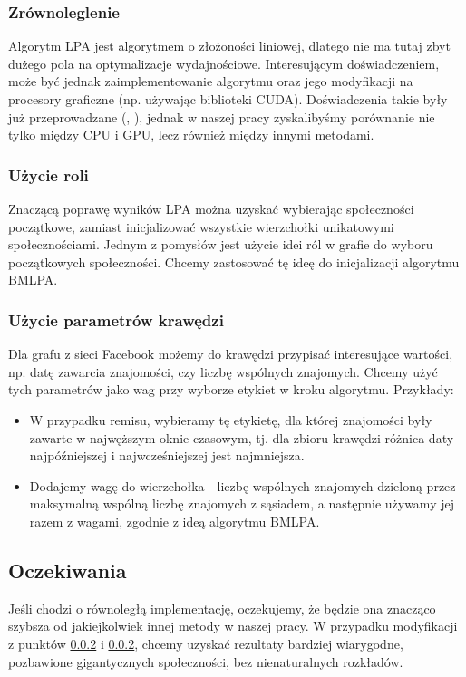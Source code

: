 \documentclass{article}
\begin{document}
\subsubsection{Zrównoleglenie}
Algorytm LPA jest algorytmem o złożoności liniowej, dlatego nie ma tutaj zbyt dużego pola na optymalizacje wydajnościowe. Interesującym doświadczeniem, może być jednak zaimplementowanie algorytmu oraz jego modyfikacji na procesory graficzne (np. używając biblioteki CUDA). Doświadczenia takie były już przeprowadzane (\cite{ms-paper5}, \cite{ms-paper6}), jednak w naszej pracy zyskalibyśmy porównanie nie tylko między CPU i GPU, lecz również między innymi metodami.
\subsubsection{Użycie roli}
\label{subsubsection:lparole}
Znaczącą poprawę wyników LPA można uzyskać wybierając społeczności początkowe, zamiast inicjalizować wszystkie wierzchołki unikatowymi społecznościami. Jednym z pomysłów jest użycie idei ról w grafie do wyboru początkowych społeczności\cite{ms-paper7}. Chcemy zastosować tę ideę do inicjalizacji algorytmu BMLPA.
\subsubsection{Użycie parametrów krawędzi}
\label{subsubsection:lpaedges}
Dla grafu z sieci Facebook możemy do krawędzi przypisać interesujące wartości, np. datę zawarcia znajomości, czy liczbę wspólnych znajomych. Chcemy użyć tych parametrów jako wag przy wyborze etykiet w kroku algorytmu. Przykłady:
\begin{itemize}
\item W przypadku remisu, wybieramy tę etykietę, dla której znajomości były zawarte w najwęższym oknie czasowym, tj. dla zbioru krawędzi różnica daty najpóźniejszej i najwcześniejszej jest najmniejsza.
\item Dodajemy wagę do wierzchołka - liczbę wspólnych znajomych dzieloną przez maksymalną wspólną liczbę znajomych z sąsiadem, a następnie używamy jej razem z wagami, zgodnie z ideą algorytmu BMLPA.
\end{itemize}

\subsection{Oczekiwania}
Jeśli chodzi o równoległą implementację, oczekujemy, że będzie ona znacząco szybsza od jakiejkolwiek innej metody w naszej pracy. W przypadku modyfikacji z punktów \ref{subsubsection:lparole} i \ref{subsubsection:lparole}, chcemy uzyskać rezultaty bardziej wiarygodne, pozbawione gigantycznych społeczności, bez nienaturalnych rozkładów.
\end{document}
